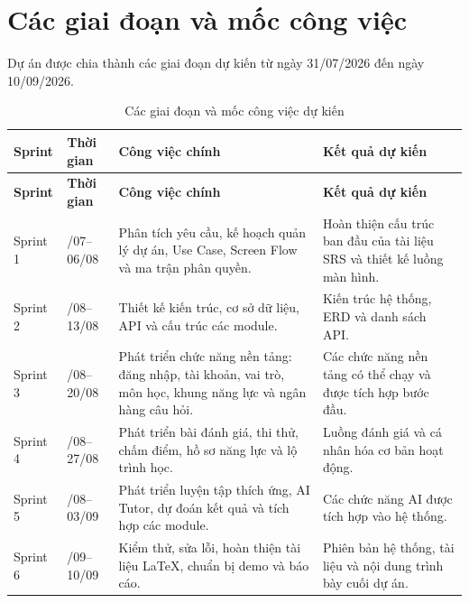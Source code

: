 \section{Các giai đoạn và mốc công việc}

Dự án được chia thành các giai đoạn dự kiến từ ngày 31/07/2026 đến
ngày 10/09/2026.

\begin{longtable}{
		|>{\centering\arraybackslash}p{1.5cm}
		|>{\centering\arraybackslash}p{2.8cm}
		|p{5.2cm}
		|p{4.7cm}|
	}
	\caption{Các giai đoạn và mốc công việc dự kiến}
	\label{tab:project-milestones}\\
	\hline
	\textbf{Sprint} &
	\textbf{Thời gian} &
	\textbf{Công việc chính} &
	\textbf{Kết quả dự kiến} \\
	\hline
	\endfirsthead
	
	\hline
	\textbf{Sprint} &
	\textbf{Thời gian} &
	\textbf{Công việc chính} &
	\textbf{Kết quả dự kiến} \\
	\hline
	\endhead
	
	Sprint 1 &
	31/07--06/08 &
	Phân tích yêu cầu, kế hoạch quản lý dự án, Use Case, Screen Flow và
	ma trận phân quyền. &
	Hoàn thiện cấu trúc ban đầu của tài liệu SRS và thiết kế luồng màn hình. \\
	\hline
	
	Sprint 2 &
	07/08--13/08 &
	Thiết kế kiến trúc, cơ sở dữ liệu, API và cấu trúc các module. &
	Kiến trúc hệ thống, ERD và danh sách API. \\
	\hline
	
	Sprint 3 &
	14/08--20/08 &
	Phát triển chức năng nền tảng: đăng nhập, tài khoản, vai trò, môn học,
	khung năng lực và ngân hàng câu hỏi. &
	Các chức năng nền tảng có thể chạy và được tích hợp bước đầu. \\
	\hline
	
	Sprint 4 &
	21/08--27/08 &
	Phát triển bài đánh giá, thi thử, chấm điểm, hồ sơ năng lực và lộ trình
	học. &
	Luồng đánh giá và cá nhân hóa cơ bản hoạt động. \\
	\hline
	
	Sprint 5 &
	28/08--03/09 &
	Phát triển luyện tập thích ứng, AI Tutor, dự đoán kết quả và tích hợp
	các module. &
	Các chức năng AI được tích hợp vào hệ thống. \\
	\hline
	
	Sprint 6 &
	04/09--10/09 &
	Kiểm thử, sửa lỗi, hoàn thiện tài liệu LaTeX, chuẩn bị demo và báo cáo. &
	Phiên bản hệ thống, tài liệu và nội dung trình bày cuối dự án. \\
	\hline
	
\end{longtable}

